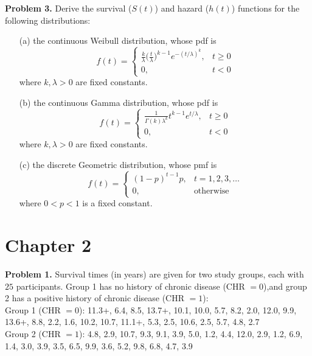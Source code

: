 \documentclass[12pt]{article}
\begin{document}
\textbf{Problem 3.}
Derive the survival ($S(t)$) and hazard ($h(t)$) functions for the following distributions:
\begin{itemize}
	\item[(a)] the continuous Weibull distribution, whose pdf is
	$$
	f(t) = \begin{cases} \frac{k}{\lambda} \Big(\frac{t}{\lambda}\Big)^{k - 1} e^{-(t/\lambda)^k}, &t \geq 0 \\
		0, &t < 0
		\end{cases}
	$$ where $k, \lambda > 0$ are fixed constants. \\
	\item[(b)] the continuous Gamma distribution, whose pdf is
	$$
	f(t) = \begin{cases} \frac{1}{\Gamma(k) \lambda^k} t^{k - 1} e^{t/\lambda}, &t \geq 0 \\
		0, &t < 0
		\end{cases}
	$$ where $k, \lambda > 0$ are fixed constants. \\
	\item[(c)] the discrete Geometric distribution, whose pmf is
	$$
	f(t) = \begin{cases} (1 - p)^{t - 1} p, &t = 1, 2, 3, \ldots \\
		0, &\text{otherwise}
		\end{cases}
	$$ where $0 < p < 1$ is a fixed constant.
\end{itemize}


\clearpage


\section{Chapter 2}


\textbf{Problem 1.}
Survival times (in years) are given for two study groups, each with $25$ participants. Group 1 has no history of chronic disease (CHR $= 0$),and group 2 has a positive history of chronic disease (CHR $= 1$): \\

Group 1 (CHR $= 0$): 11.3+, 6.4, 8.5, 13.7+, 10.1, 10.0, 5.7, 8.2, 2.0, 12.0, 9.9, 13.6+, 8.8, 2.2, 1.6, 10.2, 10.7, 11.1+, 5.3, 2.5, 10.6, 2.5, 5.7, 4.8, 2.7 \\

Group 2 (CHR $= 1$): 4.8, 2.9, 10.7, 9.3, 9.1, 3.9, 5.0, 1.2, 4.4, 12.0, 2.9, 1.2, 6.9, 1.4, 3.0, 3.9, 3.5, 6.5, 9.9, 3.6, 5.2, 9.8, 6.8, 4.7, 3.9 \\
\end{document}
